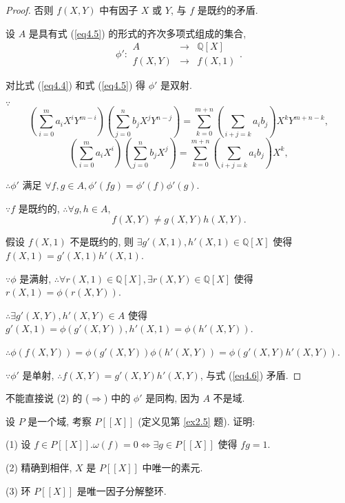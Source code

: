 \documentclass[UTF8]{ctexart}
\begin{document}
\begin{proof}
    否则 $f(X,Y)$ 中有因子 $X$ 或 $Y$, 与 $f$ 是既约的矛盾.

    设 $A$ 是具有式 (\ref{eq4.5}) 的形式的齐次多项式组成的集合,
    \[\phi':\begin{array}{rcl}
        A & \to & \mathbb{Q}[X] \\
        f(X,Y) & \to & f(X,1)
    \end{array}.\]

    对比式 (\ref{eq4.4}) 和式 (\ref{eq4.5}) 得 $\phi'$ 是双射.

    $\because$
    \[\left(\sum\limits_{i=0}^ma_iX^iY^{m-i}\right)\left(\sum\limits_{j=0}^nb_jX^jY^{n-j}\right)=\sum\limits_{k=0}^{m+n}\left(\sum\limits_{i+j=k}a_ib_j\right)X^kY^{m+n-k},\]
    \[\left(\sum\limits_{i=0}^ma_iX^i\right)\left(\sum\limits_{j=0}^nb_jX^j\right)=\sum\limits_{k=0}^{m+n}\left(\sum\limits_{i+j=k}a_ib_j\right)X^k,\]

    $\therefore\phi'$ 满足 $\forall f,g\in A,\phi'(fg)=\phi'(f)\phi'(g)$.

    $\because f$ 是既约的, $\therefore\forall g,h\in A$,
    \begin{equation}\label{eq4.6}
        f(X,Y)\neq g(X,Y)h(X,Y).
    \end{equation}
    
    假设 $f(X,1)$ 不是既约的, 则 $\exists g'(X,1),h'(X,1)\in\mathbb{Q}[X]$ 使得 $f(X,1)=g'(X,1)h'(X,1)$.

    $\because\phi$ 是满射, $\therefore\forall r(X,1)\in\mathbb{Q}[X],\exists r(X,Y)\in\mathbb{Q}[X]$ 使得 $r(X,1)=\phi(r(X,Y))$.

    $\therefore\exists g'(X,Y),h'(X,Y)\in A$ 使得 $g'(X,1)=\phi(g'(X,Y)),h'(X,1)=\phi(h'(X,Y))$.

    $\therefore\phi(f(X,Y))=\phi(g'(X,Y))\phi(h'(X,Y))=\phi(g'(X,Y)h'(X,Y))$.

    $\because\phi'$ 是单射, $\therefore f(X,Y)=g'(X,Y)h'(X,Y)$, 与式 (\ref{eq4.6}) 矛盾.
\end{proof}
\begin{note}
    不能直接说 (2) 的 ($\Rightarrow$) 中的 $\phi'$ 是同构, 因为 $A$ 不是域.
\end{note}
\begin{exercise}[3.6]\label{ex3.6}
    设 $P$ 是一个域, 考察 $P[[X]]$ (定义见第 \ref{ex2.5} 题). 证明:

    (1) 设 $f\in P[[X]].\omega(f)=0\Leftrightarrow\exists g\in P[[X]]$ 使得 $fg=1$.

    (2) 精确到相伴, $X$ 是 $P[[X]]$ 中唯一的素元.

    (3) 环 $P[[X]]$ 是唯一因子分解整环.
\end{exercise}
\end{document}
